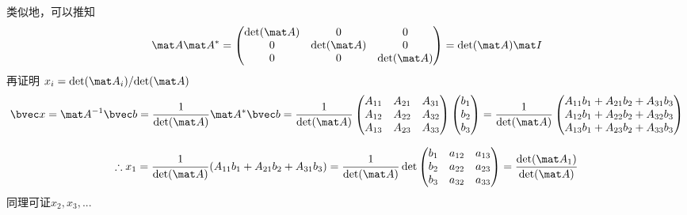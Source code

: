 类似地，可以推知
\begin{equation}
\mat A \mat A^* =
\begin{pmatrix}
\det(\mat A)&0&0\\
0&\det(\mat A)&0\\
0&0&\det(\mat A)\\
\end{pmatrix}
=\det(\mat A) \mat I
\end{equation}
再证明 $x_i={\det(\mat A_i)}/{\det(\mat A)}$
$$
\bvec x = \mat A^{-1} \bvec b = \frac{1}{\det(\mat A)}\mat A^* \bvec b = 
\frac{1}{\det(\mat A)}
\begin{pmatrix}
A_{11}&A_{21}&A_{31}\\
A_{12}&A_{22}&A_{32}\\
A_{13}&A_{23}&A_{33}\\
\end{pmatrix}
\begin{pmatrix}
b_1\\
b_2\\
b_3\\
\end{pmatrix}
=
\frac{1}{\det(\mat A)}
\begin{pmatrix}
A_{11}b_1+A_{21}b_2+A_{31}b_3\\
A_{12}b_1+A_{22}b_2+A_{32}b_3\\
A_{13}b_1+A_{23}b_2+A_{33}b_3\\
\end{pmatrix}
$$

$$
\therefore x_1=\frac{1}{\det(\mat A)}(A_{11}b_1+A_{21}b_2+A_{31}b_3)
=\frac{1}{\det(\mat A)}\det
\begin{pmatrix}
b_{1}&a_{12}&a_{13}\\
b_{2}&a_{22}&a_{23}\\
b_{3}&a_{32}&a_{33}\\
\end{pmatrix}
=\frac{\det(\mat A_1)}{\det(\mat A)}
$$
同理可证$x_2, x_3,...$

